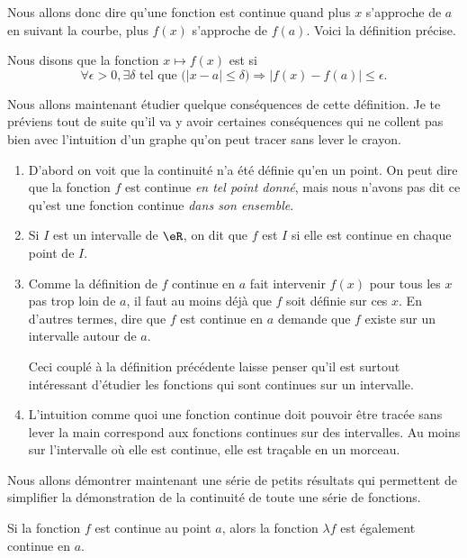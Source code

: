 Nous allons donc dire qu'une fonction est continue quand plus $x$ s'approche de $a$ en suivant la courbe, plus $f(x)$ s'approche de $f(a)$. Voici la définition précise.

\begin{definition}		\label{DefContinue}
Nous disons que la fonction $x\mapsto f(x)$ est  si
\begin{equation}
 \forall \epsilon>0,\exists \delta\text{ tel que } \big(| x-a |\leq\delta\big)\Rightarrow | f(x)-f(a) |\leq \epsilon.
\end{equation}

\end{definition}

Nous allons maintenant étudier quelque conséquences de cette définition. Je te préviens tout de suite qu'il va y avoir certaines conséquences qui ne collent pas bien avec l'intuition d'un graphe qu'on peut tracer sans lever le crayon.

\begin{enumerate}
\item D'abord on voit que la continuité n'a été définie qu'en un point. On peut dire que la fonction $f$ est continue \emph{en tel point donné}, mais nous n'avons pas dit ce qu'est une fonction continue \emph{dans son ensemble}.

\item Si $I$ est un intervalle de $\eR$, on dit que $f$ est  $I$ si elle est continue en chaque point de $I$.

\item Comme la définition de $f$ continue en $a$ fait intervenir $f(x)$ pour tous les $x$ pas trop loin de $a$, il faut au moins déjà que $f$ soit définie sur ces $x$. En d'autres termes, dire que $f$ est continue en $a$ demande que $f$ existe sur un intervalle autour de $a$. 

Ceci couplé à la définition précédente laisse penser qu'il est surtout intéressant d'étudier les fonctions qui sont continues sur un intervalle.

\item L'intuition comme quoi une fonction continue doit pouvoir être tracée sans lever la main correspond aux fonctions continues sur des intervalles. Au moins sur l'intervalle où elle est continue, elle est traçable en un morceau.
\end{enumerate}


Nous allons démontrer maintenant une série de petits résultats qui permettent de simplifier la démonstration de la continuité de toute une série de fonctions.
\begin{theorem}
Si la fonction $f$ est continue au point $a$, alors la fonction $\lambda f$ est également continue en $a$.
\end{theorem}

